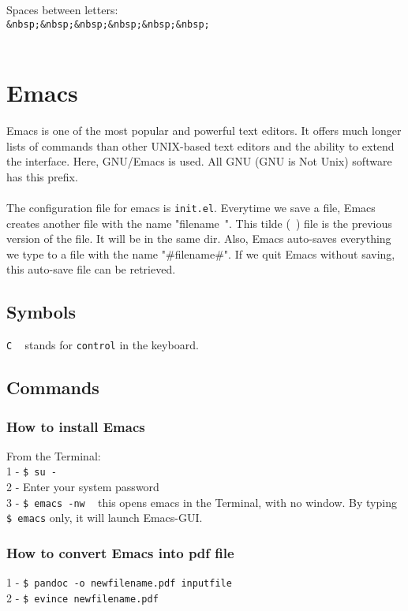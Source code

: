 \documentclass{article}
\begin{document}
{{Spaces between letters:\\
\texttt{\&nbsp;\&nbsp;\&nbsp;\&nbsp;\&nbsp;\&nbsp;} \\
\\

\newpage
\section{Emacs}
Emacs is one of the most popular and powerful text editors. It offers much longer lists of commands than other UNIX-based text editors and the ability to extend the interface. Here, GNU/Emacs is used. All GNU (GNU is Not Unix) software has this prefix. \\
\\
The configuration file for emacs is \texttt{init.el}. Everytime we save a file, Emacs creates another file with the name "filename~". This tilde (~) file is the previous version of the file. It will be in the same dir. Also, Emacs auto-saves everything we type to a file with the name "#filename#". If we quit Emacs without saving, this auto-save file can be retrieved. 

\subsection{Symbols}
\texttt{C} ~ stands for \texttt{control} in the keyboard.

\subsection{Commands}
\subsubsection{How to install Emacs}
From the Terminal:\\
1 - \texttt{\$ su -}\\
2 - Enter your system password\\
3 - \texttt{\$ emacs -nw} ~ this opens emacs in the Terminal, with no window. By typing \texttt{\$ emacs} only, it will launch Emacs-GUI.\\

\subsubsection{How to convert Emacs into pdf file}
1 - \texttt{\$ pandoc -o newfilename.pdf inputfile}\\
2 - \texttt{\$ evince newfilename.pdf} \\

}}
\end{document}
